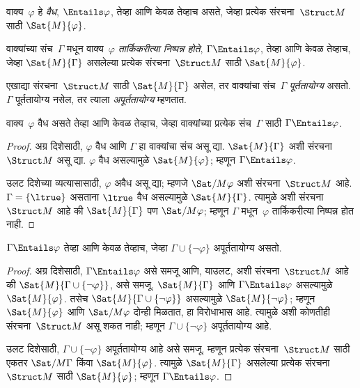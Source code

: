 \begin{defn}[वैधता]
वाक्य~$\varphi$ हे \emph{वैध}, $\Entails \varphi$, तेव्हा आणि केवळ तेव्हाच असते,
जेव्हा प्रत्येक संरचना~$\Struct M$ साठी $\Sat{M}{\varphi}$.
\end{defn}

\begin{defn}[तार्किक निष्पन्नता]
वाक्यांच्या संच~$\Gamma$ मधून वाक्य~$\varphi$
\emph{तार्किकरीत्या निष्पन्न होते}, $\Gamma \Entails \varphi$, तेव्हा आणि
केवळ तेव्हाच, जेव्हा $\Sat{M}{\Gamma}$ असलेल्या प्रत्येक
संरचना~$\Struct M$ साठी $\Sat{M}{\varphi}$.
\end{defn}


\begin{defn}[पूर्ततायोग्यता]
एखाद्या संरचना~$\Struct M$ साठी $\Sat{M}{\Gamma}$ असेल, तर
वाक्यांचा संच~$\Gamma$ \emph{पूर्ततायोग्य} असतो. $\Gamma$
पूर्ततायोग्य नसेल, तर त्याला \emph{अपूर्ततायोग्य} म्हणतात.
\end{defn}

\begin{prop}
वाक्य~$\varphi$ वैध असते तेव्हा आणि केवळ तेव्हाच, जेव्हा
वाक्यांच्या प्रत्येक संच~$\Gamma$ साठी $\Gamma \Entails \varphi$.
\end{prop}

\begin{proof}
अग्र दिशेसाठी, $\varphi$ वैध आणि $\Gamma$ हा वाक्यांचा संच असू द्या.
$\Sat{M}{\Gamma}$ अशी संरचना~$\Struct M$ असू द्या. $\varphi$ वैध
असल्यामुळे $\Sat{M}{\varphi}$; म्हणून $\Gamma \Entails \varphi$.

उलट दिशेच्या व्यत्यासासाठी, $\varphi$ अवैध असू द्या; म्हणजे
$\Sat/{M}{\varphi}$ अशी संरचना~$\Struct M$ आहे. $\Gamma =
\{ \ltrue \}$ असताना $\ltrue$ वैध असल्यामुळे $\Sat{M}{\Gamma}$.
त्यामुळे अशी संरचना~$\Struct M$ आहे की $\Sat{M}{\Gamma}$ पण
$\Sat/{M}{\varphi}$; म्हणून $\Gamma$ मधून~$\varphi$ तार्किकरीत्या निष्पन्न होत
नाही.
\end{proof}

\begin{prop}
\label{fol:syn:sem:prop:entails-unsat}
$\Gamma \Entails \varphi$ तेव्हा आणि केवळ तेव्हाच, जेव्हा
$\Gamma \cup \{\lnot \varphi\}$ अपूर्ततायोग्य असतो.
\end{prop}

\begin{proof}
अग्र दिशेसाठी, $\Gamma \Entails \varphi$ असे समजू आणि, याउलट, अशी
संरचना~$\Struct M$ आहे की $\Sat{M}{\Gamma
  \cup \{ \lnot \varphi \}}$, असे समजू. $\Sat{M}{\Gamma}$ आणि
$\Gamma \Entails \varphi$ असल्यामुळे $\Sat{M}{\varphi}$. तसेच
$\Sat{M}{\Gamma\cup \{ \lnot \varphi \}}$ असल्यामुळे
$\Sat{M}{\lnot \varphi}$; म्हणून $\Sat{M}{\varphi}$ आणि $\Sat/{M}{\varphi}$ दोन्ही
मिळतात, हा विरोधाभास आहे. त्यामुळे अशी कोणतीही
संरचना~$\Struct M$ असू शकत नाही; म्हणून
$\Gamma \cup \{ \lnot \varphi \}$ अपूर्ततायोग्य आहे.

उलट दिशेसाठी, $\Gamma \cup \{ \lnot \varphi \}$ अपूर्ततायोग्य आहे असे
समजू. म्हणून प्रत्येक संरचना~$\Struct M$ साठी एकतर
$\Sat/{M}{\Gamma}$ किंवा $\Sat{M}{\varphi}$. त्यामुळे
$\Sat{M}{\Gamma}$ असलेल्या प्रत्येक संरचना~$\Struct M$ साठी
$\Sat{M}{\varphi}$; म्हणून $\Gamma \Entails \varphi$.
\end{proof}

